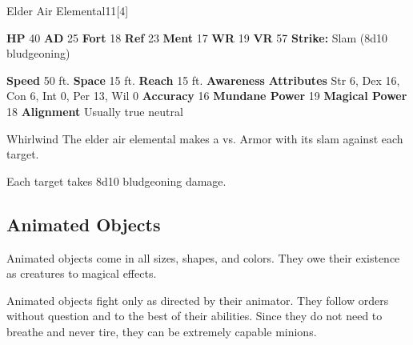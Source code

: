   \begin{monsubsection}{Elder Air Elemental}{11}[4]
    \vspace{-1em}\vspace{-1em}
    \vspace{0em}

    
    

    \begin{spellcontent}
      \begin{spelltargetinginfo}
        \pari \textbf{HP} 40 \monsep
          \textbf{AD} 25 \monsep
          \textbf{Fort} 18 \monsep
          \textbf{Ref} 23 \monsep
          \textbf{Ment} 17
        \pari \textbf{WR} 19 \monsep
        \textbf{VR} 57
        \pari \textbf{Strike:}
            Slam  (8d10 bludgeoning)
      \end{spelltargetinginfo}
    \end{spellcontent}
    \begin{monsterfooter}
      \pari \textbf{Speed} 50 ft. \monsep
        \textbf{Space} 15 ft. \monsep
        \textbf{Reach} 15 ft.
      \pari \textbf{Awareness} 
      \pari \textbf{Attributes}
        Str 6, Dex 16,
        Con 6, Int 0,
        Per 13, Wil 0
      \pari \textbf{Accuracy} 16 \monsep
        \textbf{Mundane Power} 19 \monsep
      \textbf{Magical Power} 18
      \pari \textbf{Alignment} Usually true neutral
    \end{monsterfooter}
  \end{monsubsection}
  \begin{freeability}{Whirlwind}
       The elder air elemental makes a 
         vs. Armor
        with its slam against each target.
    
    \hit Each target takes 8d10 bludgeoning damage.
    \end{freeability}
  
  
    \subsection{Animated Objects}
      
      Animated objects come in all sizes, shapes, and colors.
      They owe their existence as creatures to magical effects.
    
      Animated objects fight only as directed by their animator.
      They follow orders without question and to the best of their abilities.
      Since they do not need to breathe and never tire, they can be extremely capable minions.
    

